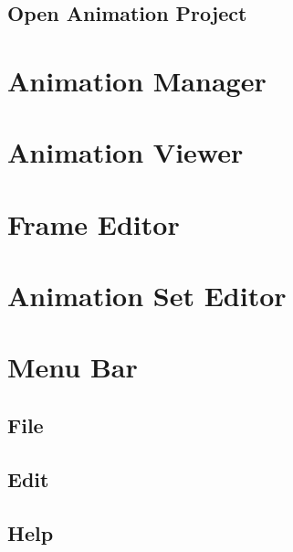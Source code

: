 \documentclass{article}
\begin{document}
\subsection{Open Animation Project}

\section{Animation Manager}

\section{Animation Viewer}

\section{Frame Editor}

\section{Animation Set Editor}

\section{Menu Bar}

\subsection{File}

\subsection{Edit}

\subsection{Help}
\end{document}
